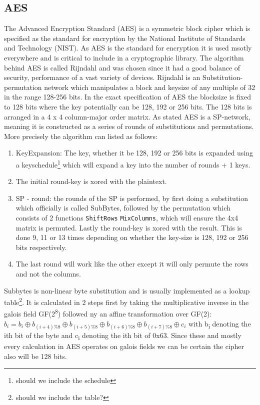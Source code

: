 \documentclass[a4paper]{article}
\begin{document}
\subsection{AES}
\label{AESalg}
The Advanced Encryption Standard (AES) is a symmetric block cipher which is specified as the standard for encryption by the National Institute of Standards and Technology (NIST). As AES is the standard for encryption it is used msotly everywhere and is critical to include in a cryptographic library. The algorithm behind AES is called Rijndahl and was chosen since it had a good balance of security, performance of a vast variety of devices\cite{AESofficial}. Rijndahl is an Substitution-permutation network which manipulates a block and keysize of any multiple of 32 in the range 128-256 bits. In the exact specification of AES the blocksize is fixed to 128 bits where the key potentially can be 128, 192 or 256 bits. The 128 bits is arranged in a 4 x 4 column-major order matrix. As stated AES is a SP-network, meaning it is constructed as a series of rounds of substitutions and permutations. More precisely the algorithm can listed as follows:
\begin{enumerate}
\item KeyExpansion: The key, whether it be 128, 192 or 256 bits is expanded using a keyschedule\footnote{should we include the schedule} which will expand a key into the number of rounds + 1 keys.
\item The initial round-key is xored with the plaintext.
\item SP - round: the rounds of the SP is performed, by first doing a substitution which officially is called SubBytes\cite{Rijndahl}, followed by the permutation which consists of 2 functions \texttt{ShiftRows} \texttt{MixColumns}, which will ensure the 4x4 matrix is permuted. Lastly the round-key is xored with the result. This is done 9, 11 or 13 times depending on whether the key-size is 128, 192 or 256 bits respectively.
\item The last round will work like the other except it will only permute the rows and not the columns.
\end{enumerate}

Subbytes is non-linear byte substitution and is usually implemented as a lookup table\footnote{should we include the table?}. It is calculated in 2 steps first by taking the multiplicative inverse in the galois field GF(2\textsuperscript{8}) followed ny an affine transformation over GF(2):
\(b_i = b_i \oplus b_{(i+4) \% 8} \oplus b_{(i+5) \% 8} \oplus b_{(i+6) \% 8} \oplus b_{(i+7) \% 8} \oplus c_i\) with b\textsubscript{i} denoting the ith bit of the byte and c\textsubscript{i} denoting the ith bit of 0x63. Since these and mostly every calculation in AES operates on galois fields we can be certain the cipher also will be 128 bits.
\end{document}
